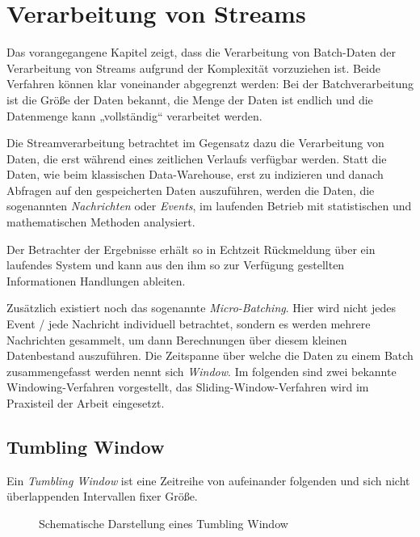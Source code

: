 \documentclass[a4paper,11pt]{scrartcl}
\begin{document}
  \section{Verarbeitung von Streams}
  Das vorangegangene Kapitel zeigt, dass die Verarbeitung von Batch-Daten der
  Verarbeitung von Streams aufgrund der Komplexität vorzuziehen ist. Beide
  Verfahren können klar voneinander abgegrenzt werden: Bei der Batchverarbeitung
  ist die Größe der Daten bekannt, die Menge der Daten ist endlich und die
  Datenmenge kann „vollständig“ verarbeitet werden.

  Die Streamverarbeitung betrachtet im Gegensatz dazu die Verarbeitung von
  Daten, die erst während eines zeitlichen Verlaufs verfügbar werden. Statt die
  Daten, wie beim klassischen Data-Warehouse, erst zu indizieren und danach
  Abfragen auf den gespeicherten Daten auszuführen, werden die Daten, die
  sogenannten \textit{Nachrichten} oder \textit{Events}, im laufenden Betrieb
  mit statistischen und mathematischen Methoden analysiert.

  Der Betrachter der Ergebnisse erhält so in Echtzeit Rückmeldung über ein
  laufendes System und kann aus den ihm so zur Verfügung gestellten Informationen
  Handlungen ableiten.

  Zusätzlich existiert noch das sogenannte \textit{Micro-Batching}.  Hier wird
  nicht jedes Event / jede Nachricht individuell betrachtet, sondern es werden
  mehrere Nachrichten gesammelt, um dann Berechnungen über diesem kleinen
  Datenbestand auszuführen. Die Zeitspanne über welche die Daten zu einem Batch
  zusammengefasst werden nennt sich \textit{Window}.\cite[S.~452]{kleppmann17}
  Im folgenden sind zwei bekannte Windowing-Verfahren vorgestellt, das
  Sliding-Window-Verfahren wird im Praxisteil der Arbeit eingesetzt.

  \subsection{Tumbling Window}
  Ein \textit{Tumbling Window} ist eine Zeitreihe von aufeinander folgenden und
  sich nicht überlappenden Intervallen fixer Größe.
  \begin{figure}[!h]
    \centering
    \caption{Schematische Darstellung eines Tumbling Window}
  \end{figure}
\end{document}
